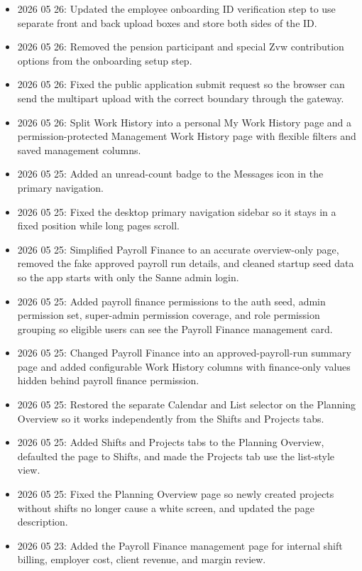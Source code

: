 \documentclass[11pt]{article}
\begin{document}
\begin{itemize}
    \item 2026 05 26: Updated the employee onboarding ID verification step to use separate front and back upload boxes and store both sides of the ID.
    \item 2026 05 26: Removed the pension participant and special Zvw contribution options from the onboarding setup step.
    \item 2026 05 26: Fixed the public application submit request so the browser can send the multipart upload with the correct boundary through the gateway.
    \item 2026 05 26: Split Work History into a personal My Work History page and a permission-protected Management Work History page with flexible filters and saved management columns.
    \item 2026 05 25: Added an unread-count badge to the Messages icon in the primary navigation.
    \item 2026 05 25: Fixed the desktop primary navigation sidebar so it stays in a fixed position while long pages scroll.
    \item 2026 05 25: Simplified Payroll Finance to an accurate overview-only page, removed the fake approved payroll run details, and cleaned startup seed data so the app starts with only the Sanne admin login.
    \item 2026 05 25: Added payroll finance permissions to the auth seed, admin permission set, super-admin permission coverage, and role permission grouping so eligible users can see the Payroll Finance management card.
    \item 2026 05 25: Changed Payroll Finance into an approved-payroll-run summary page and added configurable Work History columns with finance-only values hidden behind payroll finance permission.
    \item 2026 05 25: Restored the separate Calendar and List selector on the Planning Overview so it works independently from the Shifts and Projects tabs.
    \item 2026 05 25: Added Shifts and Projects tabs to the Planning Overview, defaulted the page to Shifts, and made the Projects tab use the list-style view.
    \item 2026 05 25: Fixed the Planning Overview page so newly created projects without shifts no longer cause a white screen, and updated the page description.
    \item 2026 05 23: Added the Payroll Finance management page for internal shift billing, employer cost, client revenue, and margin review.

\end{itemize}
\end{document}
